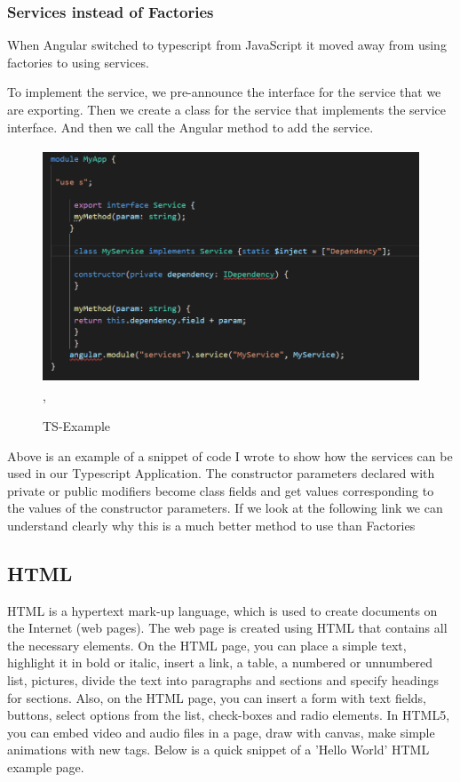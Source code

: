 \documentclass[12pt,a4paper,oneside,openany]{book}
\begin{document}
\subsubsection{Services instead of Factories}
When Angular switched to typescript from JavaScript it moved away from using factories to using services. 

To implement the service, we pre-announce the interface for the service that we are exporting. Then we create a class for the service that implements the service interface. And then we call the Angular method to add the service. \cite{TS}

\begin{figure}[ht]
\renewcommand\thefigure{4.5}
\centering
\includegraphics[width=12cm, height=7cm]{Images/TS.png},
\caption{TS-Example}
\label{TS}
\end{figure} 

Above is an example of a snippet of code I wrote to show how the services can be used in our Typescript Application.
The constructor parameters declared with private or public modifiers become class fields and get values corresponding to the values of the constructor parameters. If we look at the following link we can understand clearly why this is a much better method to use than Factories \cite{factory}

\subsection{HTML}
HTML is a hypertext mark-up language, which is used to create documents on the Internet (web pages). The web page is created using HTML that contains all the necessary elements. On the HTML page, you can place a simple text, highlight it in bold or italic, insert a link, a table, a numbered or unnumbered list, pictures, divide the text into paragraphs and sections and specify headings for sections. Also, on the HTML page, you can insert a form with text fields, buttons, select options from the list, check-boxes and radio elements. In HTML5, you can embed video and audio files in a page,
draw with canvas, make simple animations with new tags. Below is a quick snippet of a 'Hello World' HTML example page.
\cite{html}
\end{document}
